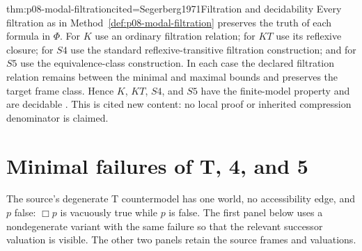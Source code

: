 \begin{hbtheorem}{thm:p08-modal-filtration}{cited=Segerberg1971}{Filtration and decidability}
Every filtration as in Method~\ref{def:p08-modal-filtration} preserves the
truth of each formula in \(\Phi\).  For \(K\) use an ordinary filtration
relation; for \(KT\) use its reflexive closure; for \(S4\) use the standard
reflexive-transitive filtration construction; and for \(S5\) use the
equivalence-class construction.
In each case the declared filtration relation remains between the minimal and maximal
bounds and preserves the target frame class.  Hence \(K\), \(KT\), \(S4\),
and \(S5\) have the
finite-model property and are decidable
\cite{BlackburnDeRijkeVenema2001,ChagrovZakharyaschev1997}.  This is cited new
content: no local proof or inherited compression denominator is claimed.
\end{hbtheorem}

\section{Minimal failures of T, 4, and 5}

The source's degenerate T countermodel has one world, no accessibility edge,
and \(p\) false: \(\Box p\) is vacuously true while \(p\) is false.  The
first panel below uses a nondegenerate variant with the same failure so that
the relevant successor valuation is visible.  The other two panels retain the
source frames and valuations.

